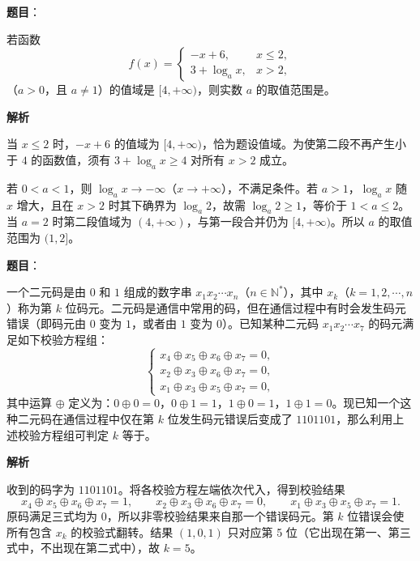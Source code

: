 \begin{answer}

\textbf{题目}：

若函数
\nopagebreak[4]
\[
f(x)=\begin{cases}
-x+6,&x\leqslant2,\\
3+\log_a x,&x>2,
\end{cases}
\]
（$a>0$，且 $a\ne1$）的值域是 $[4,+\infty)$，则实数 $a$ 的取值范围是\gkblank{}。

\textbf{解析}

当 $x\leqslant2$ 时，$-x+6$ 的值域为 $[4,+\infty)$，恰为题设值域。为使第二段不再产生小于 $4$ 的函数值，须有 $3+\log_a x\geqslant4$ 对所有 $x>2$ 成立。

若 $0<a<1$，则 $\log_a x\to-\infty$（$x\to+\infty$），不满足条件。若 $a>1$，$\log_a x$ 随 $x$ 增大，且在 $x>2$ 时其下确界为 $\log_a2$，故需 $\log_a2\geqslant1$，等价于 $1<a\leqslant2$。当 $a=2$ 时第二段值域为 $(4,+\infty)$，与第一段合并仍为 $[4,+\infty)$。所以 $a$ 的取值范围为 $(1,2]$。


\end{answer}
\begin{answer}

\textbf{题目}：

一个二元码是由 $0$ 和 $1$ 组成的数字串 $x_1x_2\cdots x_n$（$n\in\mathbb{N}^*$），其中 $x_k$（$k=1,2,\cdots,n$）称为第 $k$ 位码元。二元码是通信中常用的码，但在通信过程中有时会发生码元错误（即码元由 $0$ 变为 $1$，或者由 $1$ 变为 $0$）。已知某种二元码 $x_1x_2\cdots x_7$ 的码元满足如下校验方程组：
\nopagebreak[4]
\[
\begin{cases}
x_4\oplus x_5\oplus x_6\oplus x_7=0,\\
x_2\oplus x_3\oplus x_6\oplus x_7=0,\\
x_1\oplus x_3\oplus x_5\oplus x_7=0,
\end{cases}
\]
其中运算 $\oplus$ 定义为：$0\oplus0=0$，$0\oplus1=1$，$1\oplus0=1$，$1\oplus1=0$。现已知一个这种二元码在通信过程中仅在第 $k$ 位发生码元错误后变成了 $1101101$，那么利用上述校验方程组可判定 $k$ 等于\gkblank{}。

\textbf{解析}

收到的码字为 $1101101$。将各校验方程左端依次代入，得到校验结果
\nopagebreak[4]
\[
x_4\oplus x_5\oplus x_6\oplus x_7=1,\qquad
x_2\oplus x_3\oplus x_6\oplus x_7=0,\qquad
x_1\oplus x_3\oplus x_5\oplus x_7=1.
\]
原码满足三式均为 $0$，所以非零校验结果来自那一个错误码元。第 $k$ 位错误会使所有包含 $x_k$ 的校验式翻转。结果 $(1,0,1)$ 只对应第 5 位（它出现在第一、第三式中，不出现在第二式中），故 $k=5$。


\end{answer}
